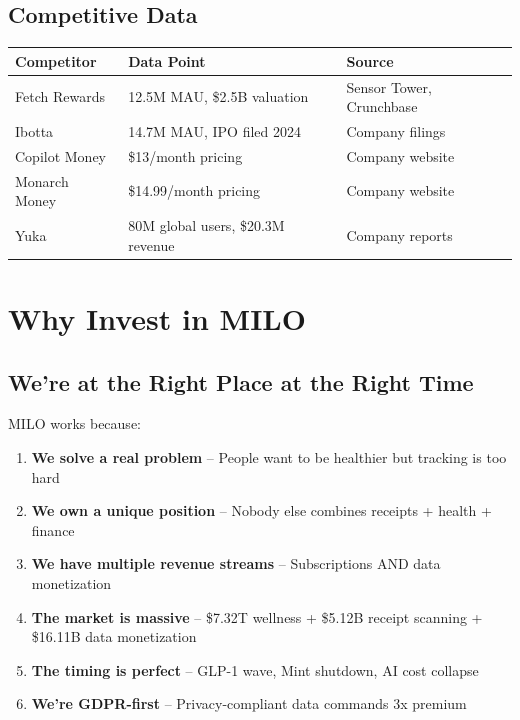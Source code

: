 \documentclass[11pt,a4paper]{report}
\begin{document}
\section{Competitive Data}

\begin{center}
\renewcommand{\arraystretch}{1.4}
\begin{tabular}{>{\raggedright\arraybackslash}p{4cm} >{\raggedright\arraybackslash}p{6cm} >{\raggedright\arraybackslash}p{3.5cm}}
\toprule
\rowcolor{miloprimary!15}
\textbf{Competitor} & \textbf{Data Point} & \textbf{Source} \\
\midrule
Fetch Rewards & 12.5M MAU, \$2.5B valuation & Sensor Tower, Crunchbase \\
\rowcolor{lightbg}
Ibotta & 14.7M MAU, IPO filed 2024 & Company filings \\
Copilot Money & \$13/month pricing & Company website \\
\rowcolor{lightbg}
Monarch Money & \$14.99/month pricing & Company website \\
Yuka & 80M global users, \$20.3M revenue & Company reports \\
\bottomrule
\end{tabular}
\end{center}

\chapter{Why Invest in MILO}

\section{We're at the Right Place at the Right Time}

MILO works because:

\begin{enumerate}[leftmargin=2em, itemsep=4pt]
    \item \textbf{We solve a real problem} -- People want to be healthier but tracking is too hard
    \item \textbf{We own a unique position} -- Nobody else combines receipts + health + finance
    \item \textbf{We have multiple revenue streams} -- Subscriptions AND data monetization
    \item \textbf{The market is massive} -- \$7.32T wellness + \$5.12B receipt scanning + \$16.11B data monetization
    \item \textbf{The timing is perfect} -- GLP-1 wave, Mint shutdown, AI cost collapse
    \item \textbf{We're GDPR-first} -- Privacy-compliant data commands 3x premium
\end{enumerate}
\end{document}

